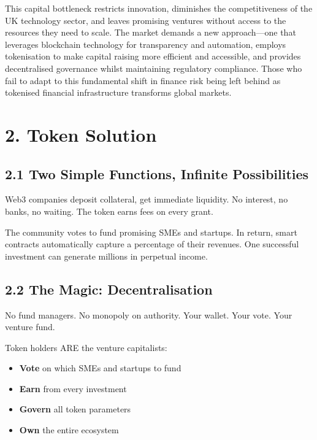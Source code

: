 \documentclass[
  paper=a4,
  ,captions=tableheading
]{scrartcl}
\providecommand{\tightlist}{%
  \setlength{\itemsep}{0pt}\setlength{\parskip}{0pt}}
\begin{document}
This capital bottleneck restricts innovation, diminishes the
competitiveness of the UK technology sector, and leaves promising
ventures without access to the resources they need to scale. The market
demands a new approach---one that leverages blockchain technology for
transparency and automation, employs tokenisation to make capital
raising more efficient and accessible, and provides decentralised
governance whilst maintaining regulatory compliance. Those who fail to
adapt to this fundamental shift in finance risk being left behind as
tokenised financial infrastructure transforms global markets.

\section{2. Token Solution}\label{token-solution}

\subsection{2.1 Two Simple Functions, Infinite
Possibilities}\label{two-simple-functions-infinite-possibilities}

Web3 companies deposit collateral, get immediate liquidity. No interest,
no banks, no waiting. The token earns fees on every grant.

The community votes to fund promising SMEs
and startups. In return, smart contracts automatically capture a
percentage of their revenues. One successful investment can generate
millions in perpetual income.

\subsection{2.2 The Magic:
Decentralisation}\label{the-magic-decentralisation}

No fund managers. No monopoly on authority. Your wallet. Your vote. Your venture fund.

Token holders ARE the venture capitalists:

\begin{itemize}
\tightlist
\item
  \textbf{Vote} on which SMEs and startups
  to fund
\item
  \textbf{Earn} from every investment
\item
  \textbf{Govern} all token parameters
\item
  \textbf{Own} the entire ecosystem
\end{itemize}
\end{document}
